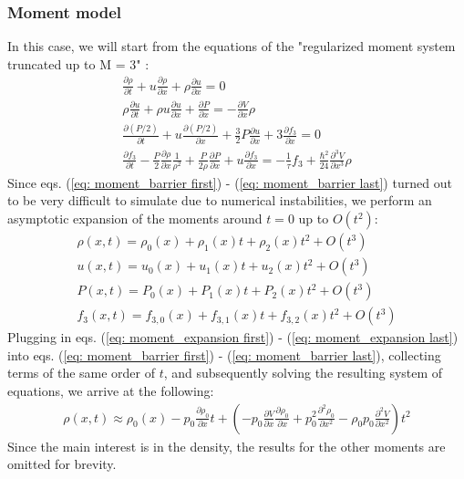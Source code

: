 \subsubsection{Moment model}
In this case, we will start from the equations of the "regularized moment system truncated up to M = 3" \cite{base}:
\begin{gather}
   \frac{\partial \rho}{\partial t} + u \frac{\partial \rho}{\partial x} + \rho \frac{\partial u}{\partial x} = 0 \label{eq: moment_barrier first} \\
   \rho \frac{\partial u}{\partial t} + \rho u \frac{\partial u}{\partial x} + \frac{\partial P}{\partial x} = - \frac{\partial V}{\partial x} \rho \\
   \frac{\partial (P/2)}{\partial t} + u \frac{\partial (P/2)}{\partial x} + \frac{3}{2} P \frac{\partial u}{\partial x} + 3 \frac{\partial f_3}{\partial x} = 0 \\
   \frac{\partial f_3}{\partial t} - \frac{P}{2} \frac{\partial \rho}{\partial x} \frac{1}{\rho^2} + \frac{P}{2 \rho} \frac{\partial P}{\partial x} + u \frac{\partial f_3}{\partial x} = - \frac{1}{\tau} f_3 + \frac{\hbar^2}{24} \frac{\partial^3 V}{\partial x^3} \rho \label{eq: moment_barrier last}
\end{gather}
Since eqs. (\ref{eq: moment_barrier first}) - (\ref{eq: moment_barrier last}) turned out to be very difficult to simulate due to numerical instabilities, we perform an asymptotic expansion of the moments around $t = 0$ up to $O(t^2)$:
\begin{gather}
        \rho(x, t) = \rho_0(x) + \rho_1(x) t + \rho_2(x) t^2 + O(t^3) \label{eq: moment_expansion first} \\
    u(x, t) = u_0(x) + u_1(x) t + u_2(x) t^2 + O(t^3) \\
    P(x, t) = P_0(x) + P_1(x) t + P_2(x) t^2 + O(t^3) \\
    f_3(x, t) = f_{3,0}(x) + f_{3,1}(x) t + f_{3,2}(x) t^2 + O(t^3) \label{eq: moment_expansion last}
\end{gather}
Plugging in eqs. (\ref{eq: moment_expansion first}) - (\ref{eq: moment_expansion last}) into eqs. (\ref{eq: moment_barrier first}) - (\ref{eq: moment_barrier last}), collecting terms of the same order of $t$, and subsequently solving the resulting system of equations, we arrive at the following:
\begin{gather}
     \rho(x, t) \approx \rho_0(x) - p_0 \frac{\partial \rho_0}{\partial x} t + \left( - p_0 \frac{\partial V}{\partial x} \frac{\partial \rho_0}{\partial x} + p_0^2 \frac{\partial^2 \rho_0}{\partial x^2} - \rho_0 p_0 \frac{\partial^2 V}{\partial x^2} \right) t^2 \label{eq: rho_expansion}
\end{gather}
Since the main interest is in the density, the results for the other moments are omitted for brevity.
